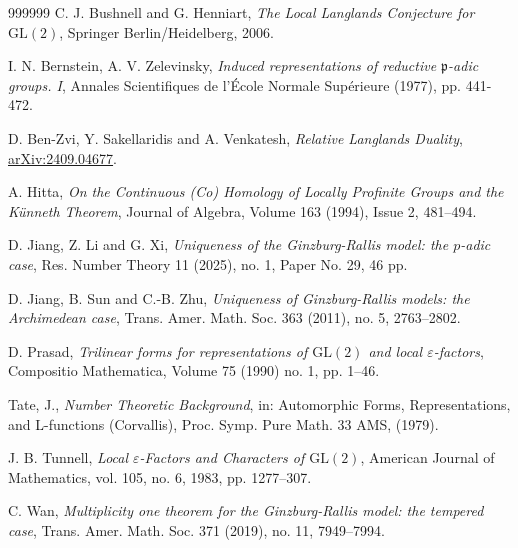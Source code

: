 \documentclass[12pt]{amsart}
\newcommand{\GL}{{\mathrm{GL}}}
\theoremstyle{Theorem}
\theoremstyle{Theorem}
\theoremstyle{Theorem}
\theoremstyle{Theorem}
\theoremstyle{Plain}
\theoremstyle{remark}
\theoremstyle{remark}
\theoremstyle{Definition}
\begin{document}
\begin{thebibliography}{999999}
    C. J. Bushnell and G. Henniart, {\it The Local Langlands Conjecture for $\GL(2)$}, Springer Berlin/Heidelberg, 2006. %
    
    I. N. Bernstein, A. V. Zelevinsky, {\it Induced representations of reductive $\mathfrak{p}$-adic groups. I}, Annales Scientifiques de l’École Normale Supérieure (1977), pp. 441-472.
    
    D. Ben-Zvi, Y. Sakellaridis and A. Venkatesh, {\it Relative Langlands Duality}, \href{https://arxiv.org/abs/2409.04677}{arXiv:2409.04677}.

     A. Hitta, {\it On the Continuous (Co) Homology of Locally Profinite Groups and the K\"{u}nneth Theorem}, Journal of Algebra, Volume 163 (1994), Issue 2, 481--494.

    D. Jiang, Z. Li and G. Xi, {\it Uniqueness of the Ginzburg-Rallis model: the $p$-adic case}, Res. Number Theory 11 (2025), no. 1, Paper No. 29, 46 pp.

    D. Jiang, B. Sun and C.-B. Zhu, {\it Uniqueness of Ginzburg-Rallis models: the Archimedean case}, Trans. Amer. Math. Soc. 363 (2011), no. 5, 2763--2802.

    D. Prasad, {\it Trilinear forms for representations of $\GL(2)$ and local $\varepsilon $-factors}, Compositio Mathematica, Volume 75 (1990) no. 1, pp. 1--46. %

    Tate, J., {\it Number Theoretic Background}, in: Automorphic Forms, Representations, and L-functions (Corvallis), Proc. Symp. Pure Math. 33 AMS, (1979). 

    J. B. Tunnell,  {\it Local $\varepsilon$-Factors and Characters of $\GL(2)$}, American Journal of Mathematics, vol. 105, no. 6, 1983, pp. 1277--307. %

    C. Wan, {\it Multiplicity one theorem for the Ginzburg-Rallis model: the tempered case}, Trans. Amer. Math. Soc. 371 (2019), no. 11, 7949--7994.
\end{thebibliography}
\end{document}
